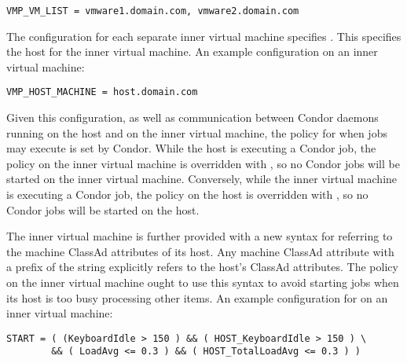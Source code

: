 \footnotesize
\begin{verbatim}
VMP_VM_LIST = vmware1.domain.com, vmware2.domain.com
\end{verbatim}
\normalsize


The configuration for each separate inner virtual machine specifies
.
This specifies the host for the inner virtual machine.
An example configuration on an inner virtual machine:

\footnotesize
\begin{verbatim}
VMP_HOST_MACHINE = host.domain.com
\end{verbatim}
\normalsize

Given this configuration, as well as communication between
Condor daemons running on the host and on the inner virtual machine,
the policy for when jobs may execute is set by Condor.
While the host is executing a Condor job,
the  policy on the inner virtual machine
is overridden with ,
so no Condor jobs will be started on the inner virtual machine.
Conversely, while the inner virtual machine is executing a Condor job,
the  policy on the host
is overridden with ,
so no Condor jobs will be started on the host.

The inner virtual machine is further provided with a new syntax for
referring to the machine ClassAd attributes of its host.
Any machine ClassAd attribute with a prefix of the string
 explicitly refers to the host's ClassAd attributes.
The  policy on the inner virtual machine
ought to use this syntax to avoid starting jobs when its host is
too busy processing other items.
An example configuration for  on an inner virtual machine:

\footnotesize
\begin{verbatim}
START = ( (KeyboardIdle > 150 ) && ( HOST_KeyboardIdle > 150 ) \
        && ( LoadAvg <= 0.3 ) && ( HOST_TotalLoadAvg <= 0.3 ) )
\end{verbatim}
\normalsize


